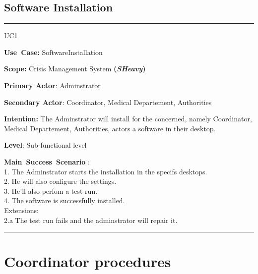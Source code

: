 \subsection{Software Installation}
\vspace{0.5cm}
\hrule
\vspace{0.5cm}
\begin{lyxlist}{UC1}
\small{
\item [\textbf{Use~Case:}] SoftwareInstallation
\item [\textbf{Scope:}] Crisis Management System \textbf{(\emph{SHeavy})}
\item [\textbf{Primary Actor}:] Adminstrator
\item [\textbf{Secondary Actor}:] Coordinator, Medical Departement, Authorities
\item [\textbf{Intention:}] The Adminstrator will install for the concerned,
namely  Coordinator, Medical Departement, Authorities, actors a software in
their desktop.
\item [\textbf{Level}:]Sub-functional level
\item [\textbf{Main~Success~Scenario}]:\\
1. The Adminstrator starts the installation in the specifs desktops.\\
2. He will also configure the settings.\\
3. He'll also perfom a test run.\\
4. The software is successfully installed.\\
Extensions:\\
2.a The test run fails and the adminstrator will repair it.\\
}
\end{lyxlist}
\hrule 
\vspace{0.5cm}

\section{Coordinator procedures}

